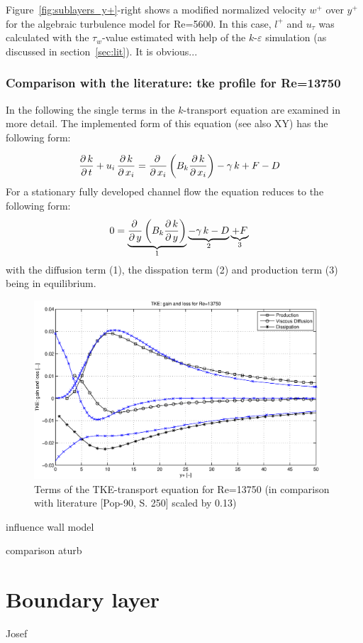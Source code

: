 \noindent Figure~\ref{fig:sublayers_y+}-right shows a modified normalized velocity $w^+$ over $y^+$ for the algebraic turbulence model for Re=5600. In this case, $l^+$ and $u_{\tau}$ was calculated with the $\tau_w$-value estimated with help of the $k$-$\varepsilon$ simulation (as discussed in section~\ref{sec:lit}). It is obvious...



%
%
	  
	  


\subsubsection*{Comparison with the literature: tke profile for Re=13750}

In the following the single terms in the $k$-transport equation are examined in more detail. The implemented form of this equation (see also XY) has the following form:

\begin{align}
\frac{\partial\,k}{\partial\,t} + u_i\,\frac{\partial\,k}{\partial\,x_i}
&=
\frac{\partial\,}{\partial\,x_i}\left(  B_k \frac{\partial\,k}{\partial\,x_i} \right) 
-
\gamma \, k
+
F
-
D
\end{align}
For a stationary fully developed channel flow the equation reduces to the following form:
\begin{align}
0
&=
\underbrace{
\frac{\partial\,}{\partial\,y}\left(  B_k \frac{\partial\,k}{\partial\,y} \right) 
}_{1}
\underbrace{
-
\gamma \, k
-
D
}_{2}
\underbrace{+
F}_3
\end{align}
with the diffusion term (1), the disspation term (2) and production term (3) being in equilibrium.
\begin{figure}[!htb]
\centering
\includegraphics[trim=60 0 60 0,clip,width=0.95\textwidth]{FIGURES/tkegainloss.eps}
\caption{Terms of the TKE-transport equation for Re=13750 (in comparison with literature [Pop-90, S. 250] scaled by 0.13)}
\label{fig:circle_in_channel}
\end{figure} 

influence wall model

comparison aturb


\newpage
\section{Boundary layer} %
\label{sec:boundary_layer}

Josef


